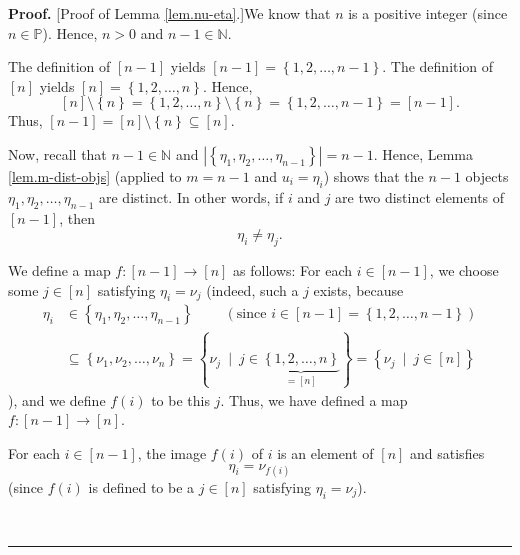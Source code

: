 \documentclass
[numbers=enddot,12pt,final,onecolumn,notitlepage,english]{scrartcl}%
\theoremstyle{definition}
\newenvironment{proof}[1][Proof]{\noindent\textbf{#1.} }{\ \rule{0.5em}{0.5em}}
\newenvironment{verlong}{}{}
\begin{document}
\begin{verlong}
\begin{proof}
[Proof of Lemma \ref{lem.nu-eta}.]We know that $n$ is a positive integer
(since $n\in\mathbb{P}$). Hence, $n>0$ and $n-1\in\mathbb{N}$.

The definition of $\left[  n-1\right]  $ yields $\left[  n-1\right]  =\left\{
1,2,\ldots,n-1\right\}  $. The definition of $\left[  n\right]  $ yields
$\left[  n\right]  =\left\{  1,2,\ldots,n\right\}  $. Hence,%
\[
\left[  n\right]  \setminus\left\{  n\right\}  =\left\{  1,2,\ldots,n\right\}
\setminus\left\{  n\right\}  =\left\{  1,2,\ldots,n-1\right\}  =\left[
n-1\right]  .
\]
Thus, $\left[  n-1\right]  =\left[  n\right]  \setminus\left\{  n\right\}
\subseteq\left[  n\right]  $.

Now, recall that $n-1\in\mathbb{N}$ and $\left\vert \left\{  \eta_{1},\eta
_{2},\ldots,\eta_{n-1}\right\}  \right\vert =n-1$. Hence, Lemma
\ref{lem.m-dist-objs} (applied to $m=n-1$ and $u_{i}=\eta_{i}$) shows that the
$n-1$ objects $\eta_{1},\eta_{2},\ldots,\eta_{n-1}$ are distinct. In other
words, if $i$ and $j$ are two distinct elements of $\left[  n-1\right]  $,
then%
\begin{equation}
\eta_{i}\neq\eta_{j}. \label{pf.lem.nu-eta.etapneqetaq}%
\end{equation}


We define a map $f:\left[  n-1\right]  \rightarrow\left[  n\right]  $ as
follows: For each $i\in\left[  n-1\right]  $, we choose some $j\in\left[
n\right]  $ satisfying $\eta_{i}=\nu_{j}$ (indeed, such a $j$ exists, because
\begin{align*}
\eta_{i}  &  \in\left\{  \eta_{1},\eta_{2},\ldots,\eta_{n-1}\right\}
\ \ \ \ \ \ \ \ \ \ \left(  \text{since }i\in\left[  n-1\right]  =\left\{
1,2,\ldots,n-1\right\}  \right) \\
&  \subseteq\left\{  \nu_{1},\nu_{2},\ldots,\nu_{n}\right\}  =\left\{  \nu
_{j}\ \mid\ j\in\underbrace{\left\{  1,2,\ldots,n\right\}  }_{=\left[
n\right]  }\right\}  =\left\{  \nu_{j}\ \mid\ j\in\left[  n\right]  \right\}
\end{align*}
), and we define $f\left(  i\right)  $ to be this $j$. Thus, we have defined a
map $f:\left[  n-1\right]  \rightarrow\left[  n\right]  $.

For each $i\in\left[  n-1\right]  $, the image $f\left(  i\right)  $ of $i$ is
an element of $\left[  n\right]  $ and satisfies%
\begin{equation}
\eta_{i}=\nu_{f\left(  i\right)  } \label{pf.lem.nu-eta.def-f.2}%
\end{equation}
(since $f\left(  i\right)  $ is defined to be a $j\in\left[  n\right]  $
satisfying $\eta_{i}=\nu_{j}$).


\end{proof}
\end{verlong}
\end{document}
